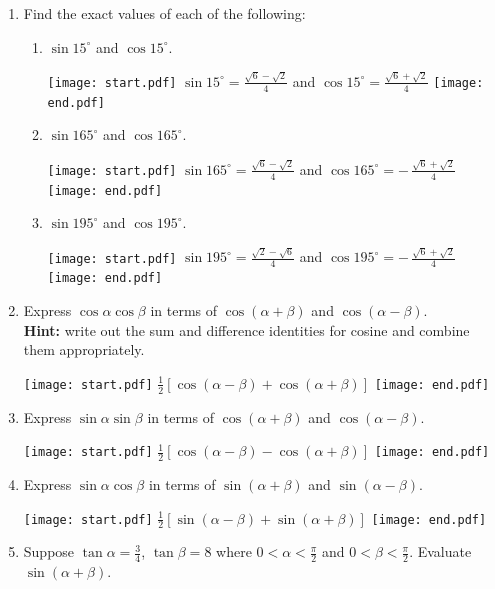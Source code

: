 \documentclass[12pt]{article}
\begin{document}
\begin{enumerate}

\item Find the exact values of each of the following:

\begin{enumerate}

\item $\sin15^\circ$ and $\cos15^\circ$.

\texttt{[image: start.pdf]}
{$\sin15^\circ=\frac{\sqrt{6}-\sqrt{2}}{4}$ and $\cos15^\circ=\frac{\sqrt{6}+\sqrt{2}}{4}$}
\texttt{[image: end.pdf]}


\item $\sin165^\circ$ and $\cos165^\circ$.

\texttt{[image: start.pdf]}
{$\sin165^\circ=\frac{\sqrt{6}-\sqrt{2}}{4}$ and $\cos165^\circ=-\,\frac{\sqrt{6}+\sqrt{2}}{4}$}
\texttt{[image: end.pdf]}


\item $\sin195^\circ$ and $\cos195^\circ$.

\texttt{[image: start.pdf]}
{$\sin195^\circ=\frac{\sqrt{2}-\sqrt{6}}{4}$ and $\cos195^\circ=-\,\frac{\sqrt{6}+\sqrt{2}}{4}$}
\texttt{[image: end.pdf]}


\end{enumerate}

\item Express $\cos{\alpha}\cos{\beta}$ in terms of $\cos{(\alpha+\beta)}$ and $\cos{(\alpha-\beta)}$.\\  {\bf Hint:} write out the sum and difference identities for cosine and combine them appropriately.

\texttt{[image: start.pdf]}
{$\frac{1}{2}\left[\cos(\alpha-\beta)+\cos(\alpha+\beta)\right]$}
\texttt{[image: end.pdf]}


\item Express $\sin{\alpha}\sin{\beta}$ in terms of $\cos{(\alpha+\beta)}$ and $\cos{(\alpha-\beta)}$.

\texttt{[image: start.pdf]}
{$\frac{1}{2}\left[\cos(\alpha-\beta)-\cos(\alpha+\beta)\right]$}
\texttt{[image: end.pdf]}


\item Express $\sin{\alpha}\cos{\beta}$ in terms of $\sin{(\alpha+\beta)}$ and $\sin{(\alpha-\beta)}$.

\texttt{[image: start.pdf]}
{$\frac{1}{2}\left[\sin(\alpha-\beta)+\sin(\alpha+\beta)\right]$}
\texttt{[image: end.pdf]}


\item Suppose $\tan\alpha=\frac{3}{4}$, $\tan\beta=8$ where $0<\alpha<\frac{\pi}{2}$ and $0<\beta<\frac{\pi}{2}$.  Evaluate $\sin(\alpha+\beta)$.


\end{enumerate}
\end{document}
